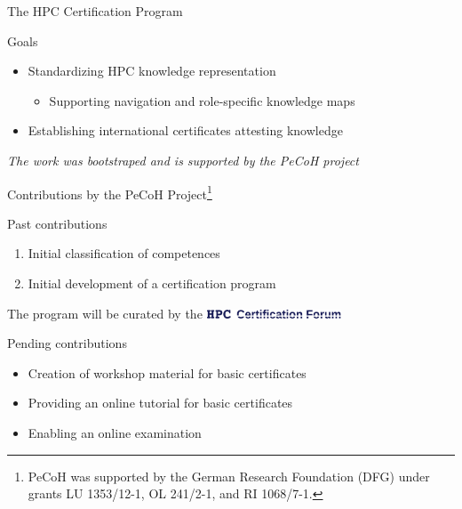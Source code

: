 \documentclass[compress,aspectratio=169]{beamer}
\begin{document}
\begin{frame}{The HPC Certification Program}
		\begin{block}{Goals}
			\begin{itemize}
				\item Standardizing HPC knowledge representation
          \begin{itemize}
            \item Supporting navigation and role-specific knowledge maps
          \end{itemize}
				\item Establishing international certificates attesting knowledge
			\end{itemize}
		\end{block}

    \textit{The work was bootstraped and is supported by the PeCoH project}
\end{frame}


\begin{frame}{Contributions by the PeCoH Project\footnote[frame]{PeCoH was supported by the German Research Foundation (DFG) under grants LU 1353/12-1, OL 241/2-1, and RI 1068/7-1.}}
	\begin{block}{Past contributions}
		\vspace*{-2mm}
		\begin{enumerate}
			\item Initial classification of competences
			\item Initial development of a certification program
		\end{enumerate}
	\end{block}

  The program will be curated by the \includegraphics[width=0.3\textwidth]{hpccf-full}

  \begin{block}{Pending contributions}
    \begin{itemize}
			\item Creation of workshop material for basic certificates
			\item Providing an online tutorial  for basic certificates
			\item Enabling an online examination
    \end{itemize}
  \end{block}
\end{frame}
\end{document}
